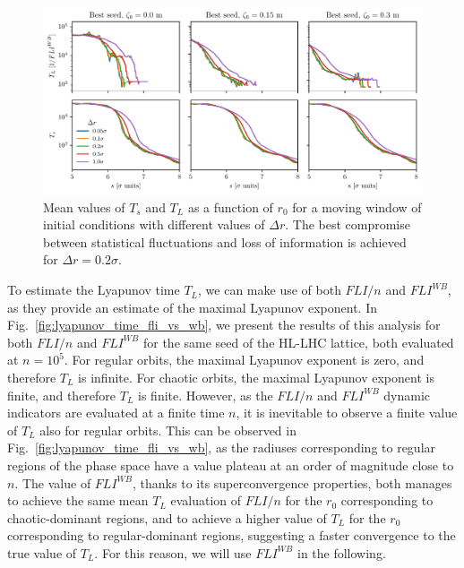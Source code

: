 \begin{figure}
    \centering
    \includegraphics[width=1\textwidth]{6_lhc_dynamic_indicators/figs/lyapunov_time_vs_thickness.pdf}
    \caption{Mean values of $T_s$ and $T_L$ as a function of $r_0$ for a moving window of initial conditions with different values of $\Delta r$. The best compromise between statistical fluctuations and loss of information is achieved for $\Delta r = 0.2\sigma$.}
    \label{fig:ts_vs_r0}
\end{figure}

To estimate the Lyapunov time $T_L$, we can make use of both $FLI/n$ and $FLI^{{WB}}$, as they provide an estimate of the maximal Lyapunov exponent. In Fig.~\ref{fig:lyapunov_time_fli_vs_wb}, we present the results of this analysis for both $FLI/n$ and $FLI^{{WB}}$ for the same seed of the HL-LHC lattice, both evaluated at $n=10^5$. For regular orbits, the maximal Lyapunov exponent is zero, and therefore $T_L$ is infinite. For chaotic orbits, the maximal Lyapunov exponent is finite, and therefore $T_L$ is finite. However, as the $FLI/n$ and $FLI^{WB}$ dynamic indicators are evaluated at a finite time $n$, it is inevitable to observe a finite value of $T_L$ also for regular orbits. This can be observed in Fig.~\ref{fig:lyapunov_time_fli_vs_wb}, as the radiuses corresponding to regular regions of the phase space have a value plateau at an order of magnitude close to $n$. The value of $FLI^{{WB}}$, thanks to its superconvergence properties, both manages to achieve the same mean $T_L$ evaluation of $FLI/n$ for the $r_0$ corresponding to chaotic-dominant regions, and to achieve a higher value of $T_L$ for the $r_0$ corresponding to regular-dominant regions, suggesting a faster convergence to the true value of $T_L$. For this reason, we will use $FLI^{{WB}}$ in the following.

